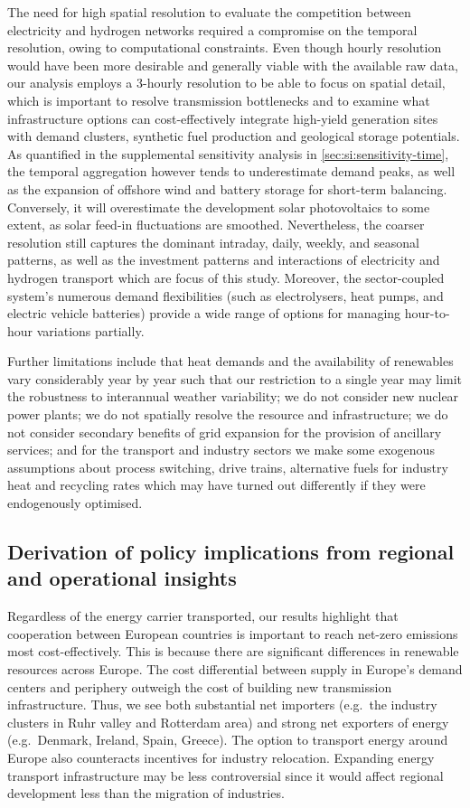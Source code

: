 The need for high spatial resolution to evaluate the competition between
electricity and hydrogen networks required a compromise on the temporal
resolution, owing to computational constraints. Even though hourly resolution
would have been more desirable and generally viable with the available raw data,
our analysis employs a 3-hourly resolution to be able to focus on spatial
detail, which is important to resolve transmission bottlenecks and to examine
what infrastructure options can cost-effectively integrate high-yield generation
sites with demand clusters, synthetic fuel production and geological storage
potentials. As quantified in the supplemental sensitivity analysis in
\cref{sec:si:sensitivity-time}, the temporal aggregation however tends to
underestimate demand peaks, as well as the expansion of offshore wind and
battery storage for short-term balancing. Conversely, it will overestimate the
development solar photovoltaics to some extent, as solar feed-in fluctuations
are smoothed. Nevertheless, the coarser resolution still captures the dominant
intraday, daily, weekly, and seasonal patterns, as well as the investment
patterns and interactions of electricity and hydrogen transport which are focus
of this study. Moreover, the sector-coupled system's numerous demand
flexibilities (such as electrolysers, heat pumps, and electric vehicle
batteries) provide a wide range of options for managing hour-to-hour variations
partially.

Further limitations include that heat demands and the availability of renewables
vary considerably year by year such that our restriction to a single year may
limit the robustness to interannual weather variability; we do not consider new
nuclear power plants; we do not spatially resolve the \co resource and
infrastructure; we do not consider secondary benefits of grid expansion for the
provision of ancillary services; and for the transport and industry sectors we
make some exogenous assumptions about process switching, drive trains,
alternative fuels for industry heat and recycling rates which may have turned
out differently if they were endogenously optimised.

\subsection*{Derivation of policy implications from regional and operational insights}
\label{sec:policy}

Regardless of the energy carrier transported, our results highlight that
cooperation between European countries is important to reach net-zero \co
emissions most cost-effectively. This is because there are significant
differences in renewable resources across Europe. The cost differential between
supply in Europe's demand centers and periphery outweigh the cost of building
new transmission infrastructure. Thus, we see both substantial net importers
(e.g.~the industry clusters in Ruhr valley and Rotterdam area) and strong net
exporters of energy (e.g.~Denmark, Ireland, Spain, Greece). The option to
transport energy around Europe also counteracts incentives for industry
relocation. Expanding energy transport infrastructure may be less controversial
since it would affect regional development less than the migration of
industries.

